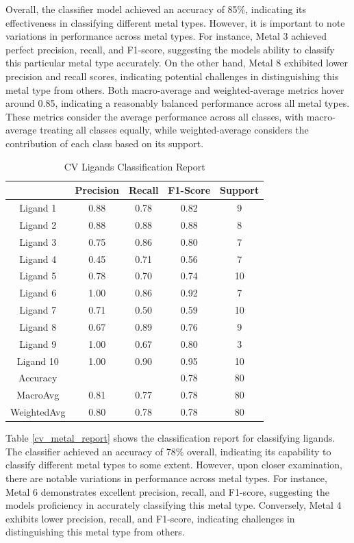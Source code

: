 Overall, the classifier model achieved an accuracy of 85\%, indicating its effectiveness in classifying different metal types. However, it is important to note variations in performance across metal types. For instance, Metal 3 achieved perfect precision, recall, and F1-score, suggesting the model\textquotesingle s ability to  classify this particular metal type accurately. On the other hand, Metal 8 exhibited lower precision and recall scores, indicating potential challenges in distinguishing this metal type from others.
Both macro-average and weighted-average metrics hover around 0.85, indicating a reasonably balanced performance across all metal types. These metrics consider the average performance across all classes, with macro-average treating all classes equally, while weighted-average considers the contribution of each class based on its support.
\begin{table}[!h]
\begin{center}
\begin{tabular}{c|c|c|c|c}
 & Precision & Recall & F1-Score & Support\\
\hline
Ligand 1 & 0.88 & 0.78 & 0.82 & 9\\
Ligand 2 & 0.88 & 0.88 & 0.88 & 8\\
Ligand 3 & 0.75 & 0.86 & 0.80 & 7\\
Ligand 4 & 0.45 & 0.71 & 0.56 & 7\\
Ligand 5 & 0.78 & 0.70 & 0.74 & 10\\
Ligand 6 & 1.00 & 0.86 & 0.92 & 7\\
Ligand 7 & 0.71 & 0.50 & 0.59 & 10\\
Ligand 8 & 0.67 & 0.89 & 0.76 & 9\\
Ligand 9 & 1.00 & 0.67 & 0.80 & 3\\
Ligand 10 & 1.00 & 0.90 & 0.95 & 10\\
\hline
Accuracy & & & 0.78 & 80\\
MacroAvg & 0.81 & 0.77 & 0.78 & 80\\
WeightedAvg & 0.80 & 0.78 & 0.78 & 80
\end{tabular}
\caption{CV Ligands Classification Report}
\label{cv_ligands_report}
\end{center}
\end{table}
Table \ref{cv_metal_report} shows the classification report for classifying ligands. The classifier achieved an accuracy of 78\% overall, indicating its capability to classify different metal types to some extent. However, upon closer examination, there are notable variations in performance across metal types. For instance, Metal 6 demonstrates excellent precision, recall, and F1-score, suggesting the model\textquotesingle s proficiency in accurately classifying this metal type. Conversely, Metal 4 exhibits lower precision, recall, and F1-score, indicating challenges in distinguishing this metal type from others.
